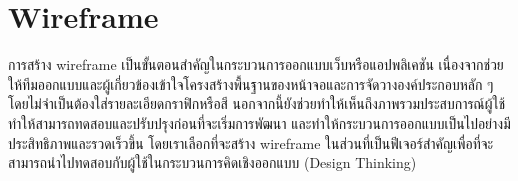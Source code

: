 
\section{Wireframe}
การสร้าง wireframe เป็นขั้นตอนสำคัญในกระบวนการออกแบบเว็บหรือแอปพลิเคชัน เนื่องจากช่วยให้ทีมออกแบบและผู้เกี่ยวข้องเข้าใจโครงสร้างพื้นฐานของหน้าจอและการจัดวางองค์ประกอบหลัก ๆ โดยไม่จำเป็นต้องใส่รายละเอียดกราฟิกหรือสี นอกจากนี้ยังช่วยทำให้เห็นถึงภาพรวมประสบการณ์ผู้ใช้
ทำให้สามารถทดสอบและปรับปรุงก่อนที่จะเริ่มการพัฒนา และทำให้กระบวนการออกแบบเป็นไปอย่างมีประสิทธิภาพและรวดเร็วขึ้น โดยเราเลือกที่จะสร้าง wireframe ในส่วนที่เป็นฟีเจอร์สำคัญเพื่อที่จะสามารถนำไปทดสอบกับผู้ใช้ในกระบวนการคิดเชิงออกแบบ (Design Thinking)
